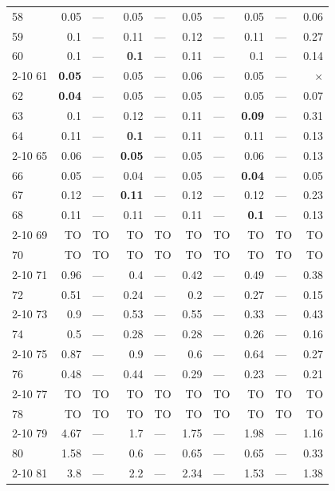 \begin{longtable}{lr@{\hskip 4pt}l@{\hskip 12pt}r@{\hskip 4pt}l@{\hskip 12pt}r@{\hskip 4pt}l@{\hskip 12pt}r@{\hskip 4pt}l@{\hskip 12pt}r}
58 & 0.05 & --- & 0.05 & --- & 0.05 & --- & 0.05 & --- & 0.06 \\
59 & 0.1 & --- & 0.11 & --- & 0.12 & --- & 0.11 & --- & 0.27 \\
60 & 0.1 & --- & \textbf{0.1} & --- & 0.11 & --- & 0.1 & --- & 0.14 \\
\cmidrule{2-10}
61 & \textbf{0.05} & --- & 0.05 & --- & 0.06 & --- & 0.05 & --- & $\times$ \\
62 & \textbf{0.04} & --- & 0.05 & --- & 0.05 & --- & 0.05 & --- & 0.07 \\
63 & 0.1 & --- & 0.12 & --- & 0.11 & --- & \textbf{0.09} & --- & 0.31 \\
64 & 0.11 & --- & \textbf{0.1} & --- & 0.11 & --- & 0.11 & --- & 0.13 \\
\cmidrule{2-10}
65 & 0.06 & --- & \textbf{0.05} & --- & 0.05 & --- & 0.06 & --- & 0.13 \\
66 & 0.05 & --- & 0.04 & --- & 0.05 & --- & \textbf{0.04} & --- & 0.05 \\
67 & 0.12 & --- & \textbf{0.11} & --- & 0.12 & --- & 0.12 & --- & 0.23 \\
68 & 0.11 & --- & 0.11 & --- & 0.11 & --- & \textbf{0.1} & --- & 0.13 \\
\cmidrule{2-10}
69 & TO & TO & TO & TO & TO & TO & TO & TO & TO \\
70 & TO & TO & TO & TO & TO & TO & TO & TO & TO \\
\cmidrule{2-10}
71 & 0.96 & --- & 0.4 & --- & 0.42 & --- & 0.49 & --- & 0.38 \\
72 & 0.51 & --- & 0.24 & --- & 0.2 & --- & 0.27 & --- & 0.15 \\
\cmidrule{2-10}
73 & 0.9 & --- & 0.53 & --- & 0.55 & --- & 0.33 & --- & 0.43 \\
74 & 0.5 & --- & 0.28 & --- & 0.28 & --- & 0.26 & --- & 0.16 \\
\cmidrule{2-10}
75 & 0.87 & --- & 0.9 & --- & 0.6 & --- & 0.64 & --- & 0.27 \\
76 & 0.48 & --- & 0.44 & --- & 0.29 & --- & 0.23 & --- & 0.21 \\
\cmidrule{2-10}
77 & TO & TO & TO & TO & TO & TO & TO & TO & TO \\
78 & TO & TO & TO & TO & TO & TO & TO & TO & TO \\
\cmidrule{2-10}
79 & 4.67 & --- & 1.7 & --- & 1.75 & --- & 1.98 & --- & 1.16 \\
80 & 1.58 & --- & 0.6 & --- & 0.65 & --- & 0.65 & --- & 0.33 \\
\cmidrule{2-10}
81 & 3.8 & --- & 2.2 & --- & 2.34 & --- & 1.53 & --- & 1.38 \\

\end{longtable}
